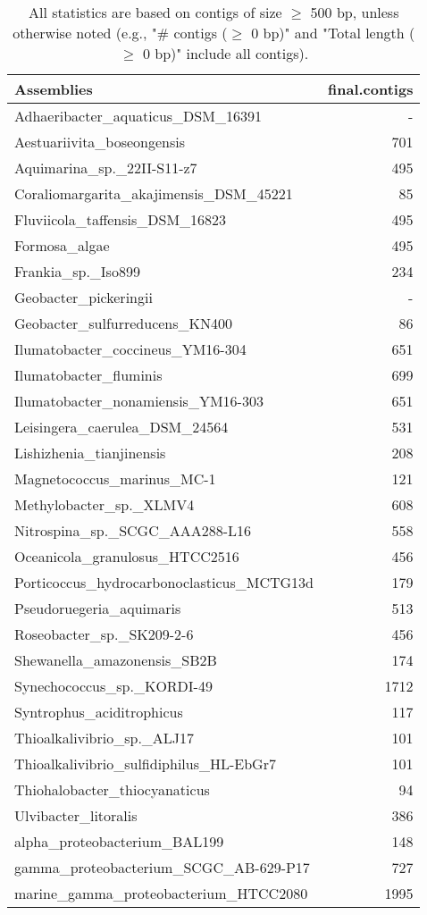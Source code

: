 \documentclass[12pt,a4paper]{article}
\begin{document}
\begin{table}[ht]
\begin{center}
\caption{All statistics are based on contigs of size $\geq$ 500 bp, unless otherwise noted (e.g., "\# contigs ($\geq$ 0 bp)" and "Total length ($\geq$ 0 bp)" include all contigs).}
\begin{tabular}{|l*{1}{|r}|}
\hline
Assemblies & final.contigs \\ \hline
Adhaeribacter\_aquaticus\_DSM\_16391 & - \\ \hline
Aestuariivita\_boseongensis & 701 \\ \hline
Aquimarina\_sp.\_22II-S11-z7 & 495 \\ \hline
Coraliomargarita\_akajimensis\_DSM\_45221 & 85 \\ \hline
Fluviicola\_taffensis\_DSM\_16823 & 495 \\ \hline
Formosa\_algae & 495 \\ \hline
Frankia\_sp.\_Iso899 & 234 \\ \hline
Geobacter\_pickeringii & - \\ \hline
Geobacter\_sulfurreducens\_KN400 & 86 \\ \hline
Ilumatobacter\_coccineus\_YM16-304 & 651 \\ \hline
Ilumatobacter\_fluminis & 699 \\ \hline
Ilumatobacter\_nonamiensis\_YM16-303 & 651 \\ \hline
Leisingera\_caerulea\_DSM\_24564 & 531 \\ \hline
Lishizhenia\_tianjinensis & 208 \\ \hline
Magnetococcus\_marinus\_MC-1 & 121 \\ \hline
Methylobacter\_sp.\_XLMV4 & 608 \\ \hline
Nitrospina\_sp.\_SCGC\_AAA288-L16 & 558 \\ \hline
Oceanicola\_granulosus\_HTCC2516 & 456 \\ \hline
Porticoccus\_hydrocarbonoclasticus\_MCTG13d & 179 \\ \hline
Pseudoruegeria\_aquimaris & 513 \\ \hline
Roseobacter\_sp.\_SK209-2-6 & 456 \\ \hline
Shewanella\_amazonensis\_SB2B & 174 \\ \hline
Synechococcus\_sp.\_KORDI-49 & 1712 \\ \hline
Syntrophus\_aciditrophicus & 117 \\ \hline
Thioalkalivibrio\_sp.\_ALJ17 & 101 \\ \hline
Thioalkalivibrio\_sulfidiphilus\_HL-EbGr7 & 101 \\ \hline
Thiohalobacter\_thiocyanaticus & 94 \\ \hline
Ulvibacter\_litoralis & 386 \\ \hline
alpha\_proteobacterium\_BAL199 & 148 \\ \hline
gamma\_proteobacterium\_SCGC\_AB-629-P17 & 727 \\ \hline
marine\_gamma\_proteobacterium\_HTCC2080 & 1995 \\ \hline
\end{tabular}
\end{center}
\end{table}
\end{document}
